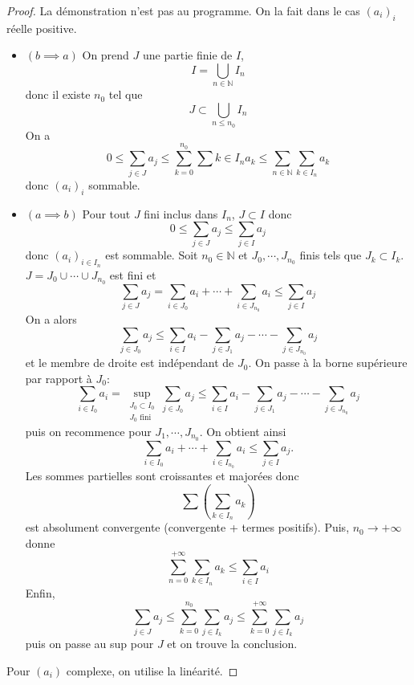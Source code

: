 \begin{proof} La démonstration n'est pas au programme. On la fait dans le cas $(a_i)_i$ réelle positive.

    \begin{itemize}
        \item $(b\implies a)$ On prend $J$ une partie finie de $I$, \[
                I=\bigcup_{n\in\mathbb N}I_n
            \]
            donc il existe $n_0$ tel que \[
                J\subset \bigcup_{n\leq n_0}I_n
            \]
            On a \[
                0\leq \sum_{j\in J}a_j\leq \sum_{k=0}^{n_0}\sum{k\in I_n}a_k\leq \sum_{n\in\mathbb N}\sum_{k\in I_n}a_k
            \]
            donc $(a_i)_i$ sommable.
        \item $(a\implies b)$ Pour tout $J$ fini inclus dans $I_n$, $J\subset I$ donc \[
                0\leq \sum_{j\in J}a_j\leq \sum_{j\in I}a_j
            \]
            donc $(a_i)_{i\in I_n}$ est sommable.
            Soit $n_0\in\mathbb N$ et $J_0, \cdots, J_{n_0}$ finis tels que $J_k\subset I_k$.
            $J=J_0\cup \cdots \cup J_{n_0}$ est fini et \[
                \sum_{j\in J}a_j=\sum_{i\in J_0}a_i+\cdots +\sum_{i\in J_{n_0}}a_i\leq \sum_{j\in I}a_j
            \]
            On a alors \[
                \sum_{j\in J_0}a_j\leq \sum_{i\in I}a_i-\sum_{j\in J_1}a_j-\cdots -\sum_{j\in J_{n_0}}a_j
            \]
            et le membre de droite est indépendant de $J_0$. On passe à la borne supérieure par rapport à $J_0$: \[
                \sum_{i\in I_0}a_i=\sup_{\substack{J_0\subset I_0\\J_0\text{ fini}}}\sum_{j\in J_0}a_j\leq \sum_{i\in I}a_i-\sum_{j\in J_1}a_j-\cdots -\sum_{j\in J_{n_0}}a_j
            \]
            puis on recommence pour $J_1, \cdots, J_{n_0}$. On obtient ainsi \[
                \sum_{i\in I_0}a_i+\cdots +\sum_{i\in I_{n_0}}a_i\leq \sum_{j\in I}a_j.
            \]
            Les sommes partielles sont croissantes et majorées donc \[
                \sum \left( \sum_{k\in I_n}a_k \right)
            \]
            est absolument convergente (convergente + termes positifs). Puis, $n_0\to+\infty$ donne \[
                \sum_{n=0}^{+\infty}\sum_{k\in I_n}a_k\leq \sum_{i\in I}a_i
            \]
            Enfin, \[
                \sum_{j\in J}a_j\leq \sum_{k=0}^{n_0}\sum_{j\in I_k}a_j\leq \sum_{k=0}^{+\infty}\sum_{j\in I_k}a_j
            \]
            puis on passe au sup pour $J$ et on trouve la conclusion.
    \end{itemize}
    Pour $(a_i)$ complexe, on utilise la linéarité.
\end{proof}

